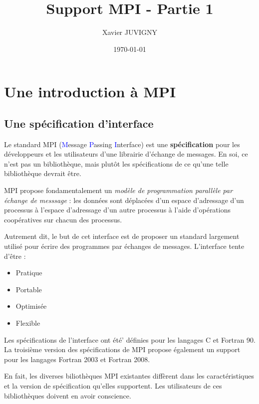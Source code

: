 \documentclass[11pt,a4paper]{article}
\author{Xavier JUVIGNY}
\date{\today}
\title{Support MPI - Partie 1}
\begin{document}
\lstset{escapechar=@,style=customcpp}

\maketitle
\tableofcontents


\section{Une introduction à MPI} 
\subsection{Une spécification d'interface}

Le standard MPI (\textcolor{blue}{M}essage \textcolor{blue}{P}assing \textcolor{blue}{I}nterface) est une 
\textbf{sp\'ecification} pour les d\'eveloppeurs et
les utilisateurs d'une librairie d'\'echange de messages. En soi, ce n'est pas un bibliothèque, mais plut\^ot
les sp\'ecifications de ce qu'une telle biblioth\`eque devrait \^etre.

MPI propose fondamentalement un \textsl{mod\`ele de programmation parall\`ele par \'echange de messsage} : les donn\'ees sont d\'eplac\'ees
d'un espace d'adressage d'un processus \`a l'espace d'adressage d'un autre processus \`a l'aide d'op\'erations
coop\'eratives sur chacun des processus.

Autrement dit, le but de cet interface est de proposer un standard largement utilis\'e
pour \'ecrire des programmes par \'echanges de messages. L'interface tente d'\^etre :
\begin{itemize}
\item Pratique
\item Portable
\item Optimis\'ee
\item Flexible
\end{itemize}

Les sp\'ecifications de l'interface ont \'et\'e' d\'efinies pour les langages C et Fortran 90. 
La troisi\`eme version des
sp\'ecifications de MPI propose \'egalement un support pour les langages Fortran 2003 et Fortran 2008.

En fait, les diverses bilioth\`eques MPI existantes diff\`erent dans les caract\'eristiques et la version de
sp\'ecification qu'elles supportent. Les utilisateurs de ces biblioth\`eques doivent en avoir conscience.
\end{document}
